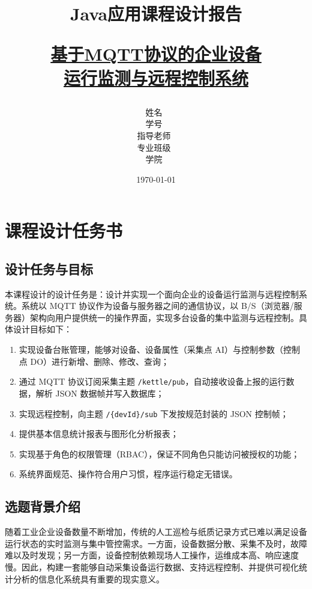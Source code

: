 \documentclass[12pt,hyperref,a4paper,UTF8]{ctexart}
\title{ 
        \vspace{1cm}
        \heiti \Huge {Java应用课程设计报告} \par
        \vspace{1cm} 
        \heiti \Large {\underline{基于MQTT协议的企业设备}} \\
        \heiti \Large {\underline{运行监测与远程控制系统}}
        \vspace{1cm}
    }
\author{
        \vspace{0.5cm}
        \kaishu\Large 姓\qquad 名\ \dlmu[9cm]{XXX} \\ %
        \vspace{0.5cm}
        \kaishu\Large 学\qquad 号\ \dlmu[9cm]{2023XXXXXX} \\ %
        \vspace{0.5cm}
        \kaishu\Large 指导老师\ \dlmu[9cm]{XXX} \\ %
        \vspace{0.5cm}
        \kaishu\Large 专业班级\ \dlmu[9cm]{智能科学与技术} \\ %
        \vspace{0.5cm}
        \kaishu\Large 学\qquad 院\ \dlmu[9cm]{信息工程学院} \\ %
    }
\date{\today} %
\begin{document}
\cover
\thispagestyle{empty} %

\newpage
\begingroup
\small
{}
\tableofcontents
\endgroup

\newpage
{} %
\setcounter{page}{1} %

\section{课程设计任务书}

\subsection{设计任务与目标}

本课程设计的设计任务是：设计并实现一个面向企业的设备运行监测与远程控制系统。系统以 MQTT 协议作为设备与服务器之间的通信协议，以 B/S（浏览器/服务器）架构向用户提供统一的操作界面，实现多台设备的集中监测与远程控制。具体设计目标如下：

\begin{enumerate}
    \item 实现设备台账管理，能够对设备、设备属性（采集点 AI）与控制参数（控制点 DO）进行新增、删除、修改、查询；
    \item 通过 MQTT 协议订阅采集主题 \texttt{/kettle/pub}，自动接收设备上报的运行数据，解析 JSON 数据帧并写入数据库；
    \item 实现远程控制，向主题 \texttt{/\{devId\}/sub} 下发按规范封装的 JSON 控制帧；
    \item 提供基本信息统计报表与图形化分析报表；
    \item 实现基于角色的权限管理（RBAC），保证不同角色只能访问被授权的功能；
    \item 系统界面规范、操作符合用户习惯，程序运行稳定无错误。
\end{enumerate}

\subsection{选题背景介绍}

随着工业企业设备数量不断增加，传统的人工巡检与纸质记录方式已难以满足设备运行状态的实时监测与集中管控需求。一方面，设备数据分散、采集不及时，故障难以及时发现；另一方面，设备控制依赖现场人工操作，运维成本高、响应速度慢。因此，构建一套能够自动采集设备运行数据、支持远程控制、并提供可视化统计分析的信息化系统具有重要的现实意义。
\end{document}
